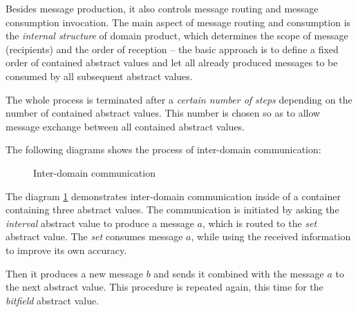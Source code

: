 \documentclass[12pt,oneside]{fithesis2}
\theoremstyle{definition}
\begin{document}
Besides message production, it also controls message routing and message consumption invocation. The main aspect of message routing and consumption is the \textit{internal structure} of domain product, which determines the scope of message (recipients) and the order of reception -- the basic approach is to define a fixed order of contained abstract values and let all already produced messages to be consumed by all subsequent abstract values.

The whole process is terminated after a \textit{certain number of steps} depending on the number of contained abstract values. This number is chosen so as to allow message exchange between all contained abstract values.

\vspace{1\baselineskip} %

The following diagrams shows the process of inter-domain communication:

\begin{figure}[ht!]
  \centering
  \caption{Inter-domain communication}
  \label{fig:communication}
\end{figure}

The diagram \ref{fig:communication} demonstrates inter-domain communication inside of a container containing three abstract values. The communication is initiated by asking the \textit{interval} abstract value to produce a message $a$, which is routed to the \textit{set} abstract value. The \textit{set} consumes message $a$, while using the received information to improve its own accuracy.

Then it produces a new message $b$ and sends it combined with the message $a$ to the next abstract value. This procedure is repeated again, this time for the \textit{bitfield} abstract value.
\end{document}
